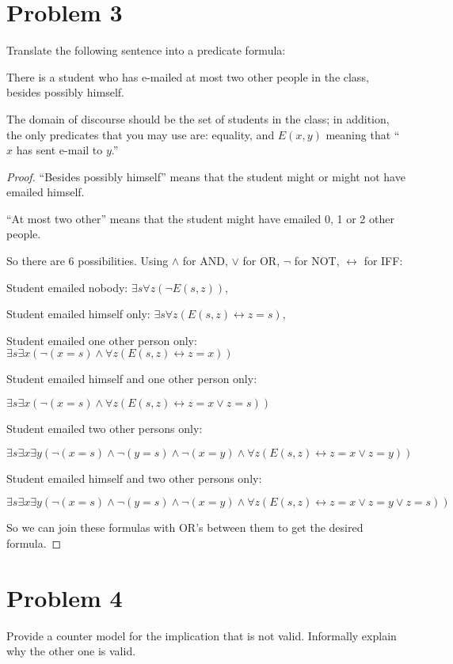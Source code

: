 \documentclass[14pt]{extarticle}
\begin{document}
\section{Problem 3}
Translate the following sentence into a predicate formula:

There is a student who has e-mailed at most two other people in the class, besides possibly himself.

The domain of discourse should be the set of students in the class; in addition, the only predicates that you may use are: equality, and $E(x, y)$ meaning that “$x$ has sent e-mail to $y$.”
\begin{proof}
``Besides possibly himself'' means that the student might or might not have emailed himself.

``At most two other'' means that the student might have emailed 0, 1 or 2 other people.

So there are 6 possibilities. Using $\wedge$ for AND, $\vee$ for OR, $\neg$ for NOT, $\leftrightarrow$ for IFF:

Student emailed nobody: $\exists s \forall z (\neg E(s,z))$,

Student emailed himself only: $\exists s \forall z (E(s,z) \leftrightarrow z = s)$,

Student emailed one other person only: $\exists s \exists x (\neg(x = s) \wedge \forall z (E(s,z) \leftrightarrow z = x))$

Student emailed himself and one other person only: 

$\exists s \exists x (\neg(x = s) \wedge \forall z (E(s,z) \leftrightarrow z = x \vee z = s))$

Student emailed two other persons only:

$\exists s \exists x \exists y (\neg(x = s) \wedge \neg(y = s) \wedge \neg(x = y) \wedge \forall z (E(s,z) \leftrightarrow z = x \vee z = y))$

Student emailed himself and two other persons only:

$\exists s \exists x \exists y (\neg(x = s) \wedge \neg(y = s) \wedge \neg(x = y) \wedge \forall z (E(s,z) \leftrightarrow z = x \vee z = y \vee z = s))$

So we can join these formulas with OR's between them to get the desired formula.
\end{proof}

\section{Problem 4}
Provide a counter model for the implication that is not valid. Informally explain why the other one is valid.
\end{document}
